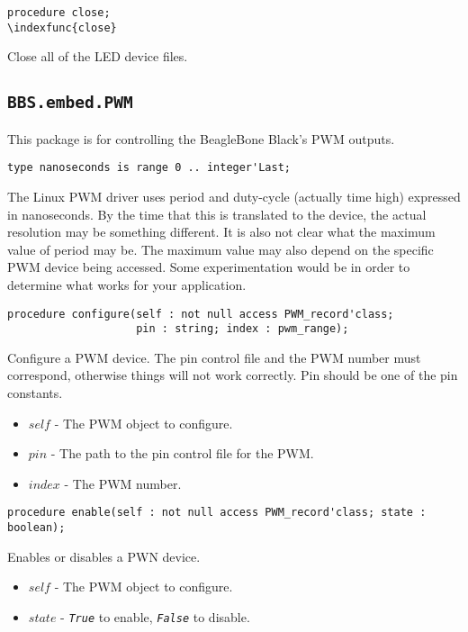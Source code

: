 \documentclass[10pt, openany]{book}
\newcommand{\indextype}[1]{\index[type]{#1}}
\newcommand{\indexfunc}[1]{\index[func]{#1}}
\newcommand{\package}[1]{\texttt{#1}}
\newcommand{\constant}[1]{\emph{\texttt{#1}}}
\begin{document}
\begin{lstlisting}
procedure close;
\indexfunc{close}
\end{lstlisting}
Close all of the LED device files.

\subsection{\package{BBS.embed.PWM}}
This package is for controlling the BeagleBone Black's PWM outputs.

\begin{lstlisting}
type nanoseconds is range 0 .. integer'Last;
\end{lstlisting}
\indextype{nanoseconds}
The Linux PWM driver uses period and duty-cycle (actually time high) expressed  in nanoseconds.  By the time that this is translated to the device, the  actual resolution may be something different.  It is also not clear what  the maximum value of period may be.  The maximum value may also depend on  the specific PWM device being accessed.  Some experimentation would be in  order to determine what works for your application.

\begin{lstlisting}
procedure configure(self : not null access PWM_record'class;
                    pin : string; index : pwm_range);
\end{lstlisting}
\indexfunc{configure}
Configure a PWM device.  The pin control file and the PWM number must correspond, otherwise things will not work correctly.  Pin should be one of the pin constants.
\begin{itemize}
  \item $self$ - The PWM object to configure.
  \item $pin$ - The path to the pin control file for the PWM.
  \item $index$ - The PWM number.
\end{itemize}

\begin{lstlisting}
procedure enable(self : not null access PWM_record'class; state : boolean);
\end{lstlisting}
\indexfunc{enable}
Enables or disables a PWN device.
\begin{itemize}
  \item $self$ - The PWM object to configure.
  \item $state$ - \constant{True} to enable, \constant{False} to disable.
\end{itemize}
\end{document}
